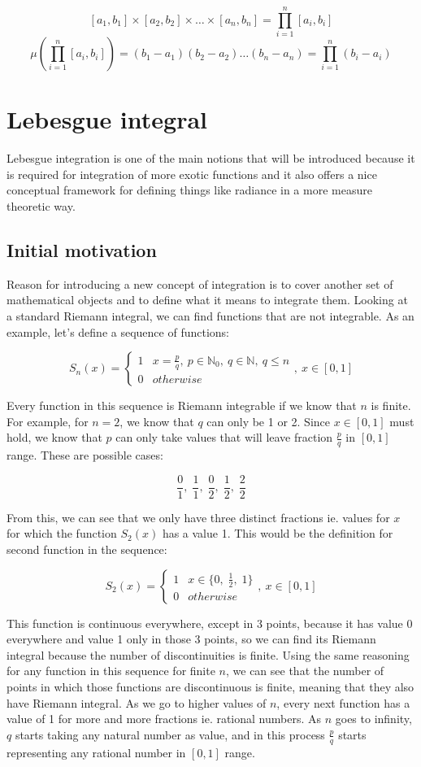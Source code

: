 \documentclass{article}
\begin{document}
\[ [a_1,b_1]\times[a_2,b_2]\times\dots\times[a_n,b_n] = \prod_{i=1}^{n}[a_i,b_i] \]
\[ \mu(\prod_{i=1}^{n}[a_i,b_i])=(b_1-a_1)(b_2-a_2)\dots(b_n-a_n)=\prod_{i=1}^{n}(b_i-a_i) \]

\section{Lebesgue integral}
Lebesgue integration is one of the main notions that will be introduced because it is required for integration of more exotic functions and it also offers a nice conceptual framework for defining things like radiance in a more measure theoretic way.

\subsection{Initial motivation}
Reason for introducing a new concept of integration is to cover another set of mathematical objects and to define what it means to integrate them. Looking at a standard Riemann integral, we can find functions that are not integrable. As an example, let's define a sequence of functions:

\[ S_n(x) = \begin{cases}
    1 & x = \frac{p}{q},\: p \in \mathbb{N}_0,\: q \in \mathbb{N},\: q \leq n \\
    0 & otherwise
\end{cases},\: x \in [0, 1] \]

Every function in this sequence is Riemann integrable if we know that $n$ is finite. For example, for $n=2$, we know that $q$ can only be 1 or 2. Since $x \in [0, 1]$ must hold, we know that $p$ can only take values that will leave fraction $\frac{p}{q}$ in $[0, 1]$ range. These are possible cases:

\[\frac{0}{1},\;\frac{1}{1},\;\frac{0}{2},\;\frac{1}{2},\;\frac{2}{2}\]

From this, we can see that we only have three distinct fractions ie. values for $x$ for which the function $S_2(x)$ has a value 1. This would be the definition for second function in the sequence:

\[S_2(x) = \begin{cases}
    1 & x \in \{0,\;\frac{1}{2},\;1\} \\
    0 & otherwise
\end{cases},\: x \in [0, 1] \]

This function is continuous everywhere, except in 3 points, because it has value 0 everywhere and value 1 only in those 3 points, so we can find its Riemann integral because the number of discontinuities is finite. Using the same reasoning for any function in this sequence for finite $n$, we can see that the number of points in which those functions are discontinuous is finite, meaning that they also have Riemann integral. As we go to higher values of $n$, every next function has a value of 1 for more and more fractions ie. rational numbers. As $n$ goes to infinity, $q$ starts taking any natural number as value, and in this process $\frac{p}{q}$ starts representing any rational number in $[0, 1]$ range.
\end{document}
